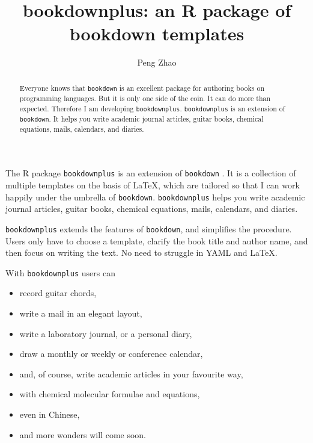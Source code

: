 \documentclass[hess, online, hvmath]{style/copernicus}
\begin{document}
\sloppy

\title{bookdownplus: an R package of bookdown templates}

\author{Peng Zhao}






\maketitle

\begin{abstract}
Everyone knows that \texttt{bookdown} is an excellent package for
authoring books on programming languages. But it is only one side of the
coin. It can do more than expected. Therefore I am developing
\texttt{bookdownplus}. \texttt{bookdownplus} is an extension of
\texttt{bookdown}. It helps you write academic journal articles, guitar
books, chemical equations, mails, calendars, and diaries.
\end{abstract}

\introduction

The R package \texttt{bookdownplus} \citep{R-bookdownplus} is an
extension of \texttt{bookdown} \citep{R-bookdown}. It is a collection of
multiple templates on the basis of LaTeX, which are tailored so that I
can work happily under the umbrella of \texttt{bookdown}.
\texttt{bookdownplus} helps you write academic journal articles, guitar
books, chemical equations, mails, calendars, and diaries.

\texttt{bookdownplus} extends the features of \texttt{bookdown}, and
simplifies the procedure. Users only have to choose a template, clarify
the book title and author name, and then focus on writing the text. No
need to struggle in YAML and LaTeX.

With \texttt{bookdownplus} users can

\begin{itemize}
\item
  record guitar chords,
\item
  write a mail in an elegant layout,
\item
  write a laboratory journal, or a personal diary,
\item
  draw a monthly or weekly or conference calendar,
\item
  and, of course, write academic articles in your favourite way,
\item
  with chemical molecular formulae and equations,
\item
  even in Chinese,
\item
  and more wonders will come soon.
\end{itemize}
\end{document}
